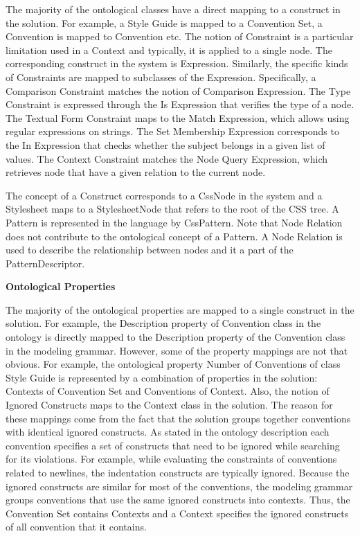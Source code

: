 \documentclass[parskip=full]{uvamscse}
\begin{document}
The majority of the ontological classes have a direct mapping to a construct in the solution. For
example, a Style Guide is mapped to a Convention Set, a Convention is mapped to Convention etc. The
notion of Constraint is a particular limitation used in a Context and typically, it is applied to a
single node. The corresponding construct in the system is Expression. Similarly, the specific kinds
of Constraints are mapped to subclasses of the Expression. Specifically, a Comparison Constraint
matches the notion of Comparison Expression. The Type Constraint is expressed through the Is
Expression that verifies the type of a node. The Textual Form Constraint maps to the Match
Expression, which allows using regular expressions on strings. The Set Membership Expression
corresponds to the In Expression that checks whether the subject belongs in a given list of values.
The Context Constraint matches the Node Query Expression, which retrieves node that have a given
relation to the current node.

The concept of a Construct corresponds to a CssNode in the system and a Stylesheet maps to a
StylesheetNode that refers to the root of the CSS tree. A Pattern is represented in the language by
CssPattern. Note that Node Relation does not contribute to the ontological concept of a Pattern. A
Node Relation is used to describe the relationship between nodes and it a part of the
PatternDescriptor.

\textbf{Ontological Properties}

The majority of the ontological properties are mapped to a single construct in the solution. For
example, the Description property of Convention class in the ontology is directly mapped to the
Description property of the Convention class in the modeling grammar. However, some of the property
mappings are not that obvious. For example, the ontological property Number of Conventions of class
Style Guide is represented by a combination of properties in the solution: Contexts of Convention
Set and Conventions of Context. Also, the notion of Ignored Constructs maps to the Context class in
the solution. The reason for these mappings come from the fact that the solution groups together
conventions with identical ignored constructs. As stated in the ontology description each convention
specifies a set of constructs that need to be ignored while searching for its violations. For
example, while evaluating the constraints of conventions related to newlines, the indentation
constructs are typically ignored. Because the ignored constructs are similar for most of the
conventions, the modeling grammar groups conventions that use the same ignored constructs into
contexts. Thus, the Convention Set contains Contexts and a Context specifies the ignored constructs
of all convention that it contains.
\end{document}

